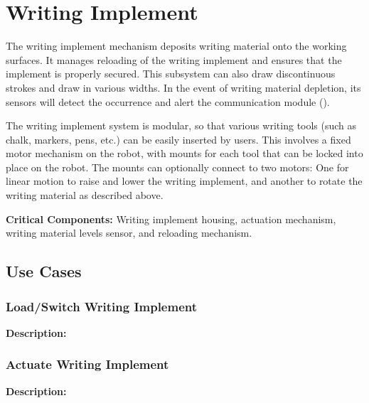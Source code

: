 
\section{Writing Implement}
\label{sec:writing_implement}
The writing implement mechanism deposits writing material onto the working surfaces. It manages reloading of the writing implement and ensures that the implement is properly secured. This subsystem can also draw discontinuous  strokes and draw in various widths. In the event of writing material depletion, its sensors will detect the occurrence and alert the communication module ().

The writing implement system is modular, so that various writing tools (such as chalk, markers, pens, etc.) can be easily inserted by users. This involves a fixed motor mechanism on the robot, with mounts for each tool that can be locked into place on the robot. The mounts can optionally connect to two motors: One for linear motion to raise and lower the writing implement, and another to rotate the writing material as described above.

\noindent
\textbf{Critical Components:} Writing implement housing, actuation mechanism, writing material levels sensor, and reloading mechanism.


\subsection{Use Cases}

\subsubsection{Load/Switch Writing Implement}
\textbf{Description:} 

\subsubsection{Actuate Writing Implement}
\textbf{Description:} 

